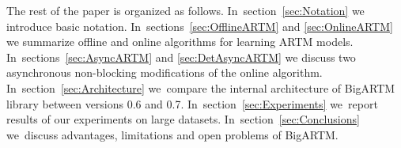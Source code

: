 \documentclass[russian,english]{llncs}
\newcommand{\kw}[1]{\mbox{\textsf{#1}}}
\begin{document}


The rest of the paper is organized as follows.
In~section~\ref{sec:Notation}
we introduce basic notation.
In~sections~\ref{sec:OfflineARTM} and \ref{sec:OnlineARTM}
we summarize offline and online algorithms for learning ARTM models.
In~sections~\ref{sec:AsyncARTM} and \ref{sec:DetAsyncARTM}
we discuss two asynchronous non-blocking modifications of the online algorithm.
In~section~\ref{sec:Architecture}
we~compare the internal architecture of BigARTM library between versions \kw{0.6} and \kw{0.7}.
In~section~\ref{sec:Experiments}
we~report results of our experiments on large datasets.
In~section~\ref{sec:Conclusions}
we~discuss advantages, limitations and open problems of BigARTM.

\end{document}
